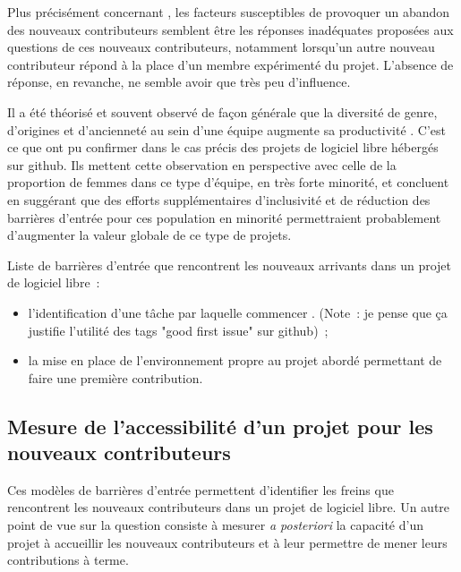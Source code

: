 Plus précisément concernant , les facteurs susceptibles de provoquer un
abandon des nouveaux contributeurs semblent être les réponses inadéquates proposées aux questions de ces
nouveaux contributeurs, notamment lorsqu'un autre nouveau contributeur répond à la place d'un membre
expérimenté du projet. L'absence de réponse, en revanche, ne semble avoir que très peu d'influence.

Il a été théorisé et souvent observé de façon générale que la diversité de genre, d'origines et d'ancienneté
au sein d'une équipe augmente sa productivité . C'est ce que
 ont pu confirmer dans le cas précis des projets de logiciel libre hébergés sur
\gls{github}. Ils mettent cette observation en perspective avec celle de la proportion de
femmes dans ce type d'équipe, en très forte minorité, et concluent en suggérant que des efforts
supplémentaires d'inclusivité et de réduction des barrières d'entrée pour ces population en minorité
permettraient probablement d'augmenter la valeur globale de ce type de projets.

Liste de barrières d'entrée que rencontrent les nouveaux arrivants dans un projet de logiciel libre :

\begin{itemize}
    \item l'identification d'une tâche par laquelle commencer . (Note : je
        pense que ça justifie l'utilité des tags "good first issue" sur \gls{github}) ;
    \item la mise en place de l'environnement propre au projet abordé permettant de faire une première
        contribution. 
\end{itemize}

\subsection{Mesure de l'accessibilité d'un projet pour les nouveaux contributeurs}

Ces modèles de barrières d'entrée permettent d'identifier les freins que rencontrent les nouveaux
contributeurs dans un projet de logiciel libre. Un autre point de vue sur la question consiste à mesurer
\emph{a posteriori} la capacité d'un projet à accueillir les nouveaux contributeurs et à leur permettre de
mener leurs contributions à terme.


